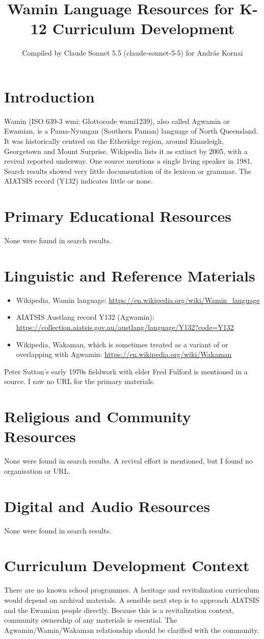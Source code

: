 \documentclass[12pt]{article}
\title{Wamin Language Resources for K-12 Curriculum Development}
\author{Compiled by Claude Sonnet 5.5 (claude-sonnet-5-5) for Andr\'as Kornai}
\date{}
\begin{document}
\maketitle

\section{Introduction}
Wamin (ISO 639-3 wmi; Glottocode wami1239), also called Agwamin or Ewamian, is a Pama-Nyungan (Southern Paman) language of North Queensland. It was historically centred on the Etheridge region, around Einasleigh, Georgetown and Mount Surprise. Wikipedia lists it as extinct by 2005, with a revival reported underway. One source mentions a single living speaker in 1981. Search results showed very little documentation of its lexicon or grammar. The AIATSIS record (Y132) indicates little or none.

\section{Primary Educational Resources}
None were found in search results.

\section{Linguistic and Reference Materials}
\begin{itemize}
\item Wikipedia, Wamin language: \url{https://en.wikipedia.org/wiki/Wamin_language}
\item AIATSIS Austlang record Y132 (Agwamin): \url{https://collection.aiatsis.gov.au/austlang/language/Y132?code=Y132}
\item Wikipedia, Wakaman, which is sometimes treated as a variant of or overlapping with Agwamin: \url{https://en.wikipedia.org/wiki/Wakaman}
\end{itemize}
Peter Sutton's early 1970s fieldwork with elder Fred Fulford is mentioned in a source. I saw no URL for the primary materials.

\section{Religious and Community Resources}
None were found in search results. A revival effort is mentioned, but I found no organisation or URL.

\section{Digital and Audio Resources}
None were found in search results.

\section{Curriculum Development Context}
There are no known school programmes. A heritage and revitalization curriculum would depend on archival materials. A sensible next step is to approach AIATSIS and the Ewamian people directly. Because this is a revitalization context, community ownership of any materials is essential. The Agwamin/Wamin/Wakaman relationship should be clarified with the community.
\end{document}
